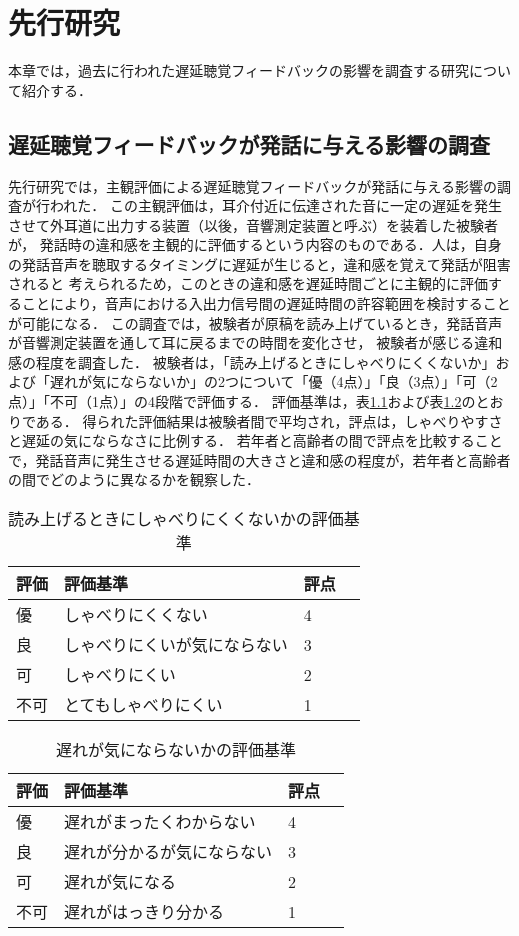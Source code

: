 \chapter{先行研究}
本章では，過去に行われた遅延聴覚フィードバックの影響を調査する研究について紹介する．
\section{遅延聴覚フィードバックが発話に与える影響の調査}
先行研究\cite{kayama}では，主観評価による遅延聴覚フィードバックが発話に与える影響の調査が行われた．
この主観評価は，耳介付近に伝達された音に一定の遅延を発生させて外耳道に出力する装置（以後，音響測定装置と呼ぶ）を装着した被験者が，
発話時の違和感を主観的に評価するという内容のものである．人は，自身の発話音声を聴取するタイミングに遅延が生じると，違和感を覚えて発話が阻害されると
考えられるため，このときの違和感を遅延時間ごとに主観的に評価することにより，音声における入出力信号間の遅延時間の許容範囲を検討することが可能になる．
この調査では，被験者が原稿を読み上げているとき，発話音声が音響測定装置を通して耳に戻るまでの時間を変化させ，
被験者が感じる違和感の程度を調査した．
被験者は，「読み上げるときにしゃべりにくくないか」および「遅れが気にならないか」の2つについて「優（4点）」「良（3点）」「可（2点）」「不可（1点）」の4段階で評価する．
評価基準は，表\ref{table:evaluation-1}および表\ref{table:evaluation-2}のとおりである．
得られた評価結果は被験者間で平均され，評点は，しゃべりやすさと遅延の気にならなさに比例する．
若年者と高齢者の間で評点を比較することで，発話音声に発生させる遅延時間の大きさと違和感の程度が，若年者と高齢者の間でどのように異なるかを観察した．
\begin{table}[tbp]
  \caption{読み上げるときにしゃべりにくくないかの評価基準}
  \label{table:evaluation-1}
  \centering
  \begin{tabular}{lllc}
    \hline
    評価 & 評価基準 & 評点\\
    \hline \hline
    優  & しゃべりにくくない & 4\\
    良  & しゃべりにくいが気にならない & 3\\
    可  & しゃべりにくい & 2\\
    不可  & とてもしゃべりにくい & 1\\
    \hline
  \end{tabular}
\end{table}
\begin{table}[tbp]
  \caption{遅れが気にならないかの評価基準}
  \label{table:evaluation-2}
  \centering
  \begin{tabular}{lllc}
    \hline
    評価 & 評価基準 & 評点\\
    \hline \hline
    優  & 遅れがまったくわからない & 4\\
    良  & 遅れが分かるが気にならない & 3\\
    可  & 遅れが気になる & 2\\
    不可  & 遅れがはっきり分かる & 1\\
    \hline
  \end{tabular}
\end{table}

